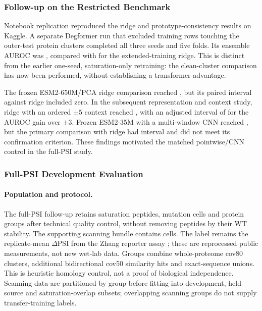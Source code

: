 \subsubsection{Follow-up on the Restricted Benchmark}
Notebook replication reproduced the ridge and prototype-consistency results on Kaggle. A separate
Degformer run that excluded training rows touching the outer-test protein clusters completed all
three seeds and five folds. Its ensemble AUROC was \nRoneAuc{}, compared with \nAucRidgeExt{} for
the extended-training ridge. This is distinct from the earlier one-seed, saturation-only retraining:
the clean-cluster comparison has now been performed, without establishing a transformer advantage.

The frozen ESM2-650M/PCA ridge comparison reached \nRtwoAuc{}, but its paired interval against
ridge included zero. In the subsequent representation and context study, ridge with an ordered
$\pm5$ context reached \nRsixWfive{}, with an adjusted interval of \nRsixWfiveCI{} for the AUROC
gain over $\pm3$. Frozen ESM2-35M with a multi-window CNN reached \nRsixMcnn{}, but the primary
comparison with ridge had interval \nRsixPrimaryCI{} and did not meet its confirmation criterion.
These findings motivated the matched pointwise/CNN control in the full-PSI study.

\subsubsection{Full-PSI Development Evaluation}\label{sec:res-fullpsi}
\paragraph{Population and protocol.}
The full-PSI follow-up retains \nVthreeNPeptides{} saturation peptides, \nVthreeNCells{} mutation
cells and \nVthreeNGroups{} protein groups after technical quality control, without removing
peptides by their WT stability. The supporting scanning bundle contains \nVthreeNScanCells{} cells.
The label remains the replicate-mean $\Delta$PSI from the Zhang reporter assay
\citep{zhang2023,zhang2023data}; these are reprocessed public measurements, not new wet-lab data.
Groups combine whole-proteome cov80 clusters, additional bidirectional cov50 similarity hits and
exact-sequence unions. This is heuristic homology control, not a proof of biological independence.
Scanning data are partitioned by group before fitting into development, held-source and
saturation-overlap subsets; overlapping scanning groups do not supply transfer-training labels.

